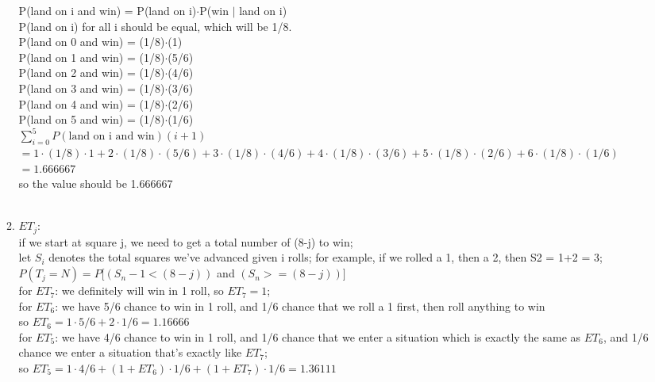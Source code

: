 \documentclass{amsart}
\begin{document}
\begin{enumerate}
\begin{enumerate}
  P(land on i and win) = P(land on i)$\cdot$P(win $|$ land on i)\\
  P(land on i) for all i should be equal, which will be 1/8.\\
  P(land on 0 and win) = (1/8)$\cdot$(1)\\
  P(land on 1 and win) = (1/8)$\cdot$(5/6)\\
  P(land on 2 and win) = (1/8)$\cdot$(4/6)\\
  P(land on 3 and win) = (1/8)$\cdot$(3/6)\\
  P(land on 4 and win) = (1/8)$\cdot$(2/6)\\
  P(land on 5 and win) = (1/8)$\cdot$(1/6)\\
$\displaystyle\sum^5_{i=0}P(\text{land on i and win})(i+1)$\\$= 1\cdot(1/8)\cdot1 + 2\cdot(1/8)\cdot(5/6) + 3\cdot(1/8)\cdot(4/6)+4\cdot(1/8)\cdot(3/6)+5\cdot(1/8)\cdot(2/6)+6\cdot(1/8)\cdot(1/6)$\\$ = 1.666667$\\
so the value should be 1.666667\\\\
  
\item $ET_j$:\\
if we start at square j, we need to get a total number of (8-j) to win;\\
  let $S_i$ denotes the total squares we've advanced given i rolls; for example, if we rolled a 1, then a 2, then S2 = 1+2 = 3;\\
  $P(T_j = N) = P[(S_n-1 < (8-j))$ and $( S_n >= (8-j))]$\\
  for $ET_7$: we definitely will win in 1 roll, so $ET_7 = 1$;\\
  for $ET_6$: we have 5/6 chance to win in 1 roll, and 1/6 chance that we roll a 1 first, then roll anything to win\\
    so $ET_6 = 1\cdot5/6 + 2\cdot1/6 = 1.16666$\\
  for $ET_5$: we have 4/6 chance to win in 1 roll, and 1/6 chance that we enter a situation which is exactly the same as $ET_6$, and 1/6 chance we enter a situation that's exactly like $ET_7$;\\
    so $ET_5 = 1\cdot4/6 + (1+ET_6)\cdot1/6  + (1+ET_7)\cdot1/6 =  1.36111$\\
  

\end{enumerate}
\end{enumerate}
\end{document}
